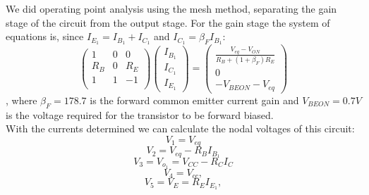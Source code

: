 We did operating point analysis using the mesh method, separating the gain stage of the circuit from the output stage. For the gain stage the system of equations is, since $I_{E_1}=I_{B_1}+I_{C_1}$ and $I_{C_1}=\beta_F I_{B_1}$:
\begin{equation}
\left(\begin{array}{ccc} 1 & 0 & 0 \\
R_B & 0 & R_E\\
1 & 1 & -1 \\
\end{array}\right)
\left(\begin{array}{c} I_{B_1} \\ I_{C_1} \\ I_{E_1}  \end{array}\right) 
= \left(\begin{array}{c} \frac{V_{eq}-V_{ON}}{R_B+(1+\beta_F)R_E}\\ 0 \\ -V_{BEON}-V_{eq}  \end{array}\right)
\end{equation},
where $\beta_F=178.7$ is the forward common emitter current gain and $V_{BEON}=0.7V$ is the voltage required for the transistor to be forward biased. \\
With the currents determined we can calculate the nodal voltages of this circuit:
\begin{equation}
    V_1=V_{eq}
\end{equation}
\begin{equation}
    V_2=V_{eq}-R_B I_{B_1}
\end{equation}
\begin{equation}
    V_3=V_{o_{1}}=V_{CC}-R_C I_C
\end{equation}
\begin{equation}
    V_4=V_{cc},
\end{equation}
\begin{equation}
    V_5= V_E=R_E I_{E_1},
\end{equation}

